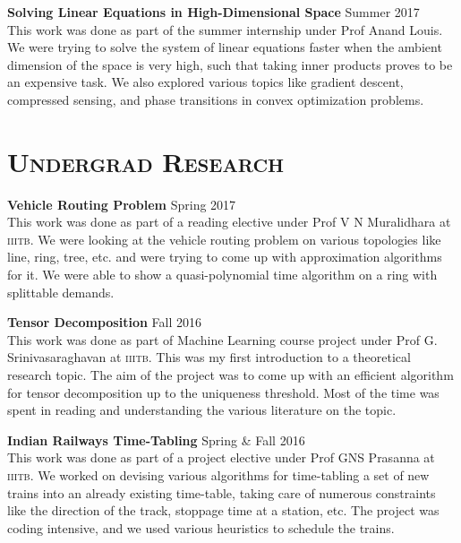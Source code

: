 \documentclass[line,margin]{res2}
\begin{document}
\begin{resume}
              {\bf Solving Linear Equations in High-Dimensional Space} \hfill Summer 2017\\
              This work was done as part of the summer internship under Prof Anand Louis. We were trying to solve the system of linear equations faster when the ambient dimension of the space is very high, such that taking inner products proves to be an expensive task. We also explored various topics like gradient descent, compressed sensing, and phase transitions in convex optimization problems.

\section{\textsc{Undergrad Research}}


               {\bf Vehicle Routing Problem} \hfill Spring 2017\\
              This work was done as part of a reading elective under {Prof V N Muralidhara} at \textsc{iiitb}. We were looking at the vehicle routing problem on various topologies like line, ring, tree, etc. and were trying to come up with approximation algorithms for it. We were able to show a quasi-polynomial time algorithm on a ring with splittable demands.

              {\bf Tensor Decomposition} \hfill Fall 2016\\
              This work was done as part of Machine Learning course project under Prof G. Srinivasaraghavan at \textsc{iiitb}. This was my first introduction to a theoretical research topic. The aim of the project was to come up with an efficient algorithm for tensor decomposition up to the uniqueness threshold. Most of the time was spent in reading and understanding the various literature on the topic.

              {\bf Indian Railways Time-Tabling} \hfill Spring \& Fall 2016\\
              This work was done as part of a project elective under {Prof GNS Prasanna} at \textsc{iiitb}. We worked on devising various algorithms for time-tabling a set of new trains into an already existing time-table, taking care of numerous constraints like the direction of the track, stoppage time at a station, etc. The project was coding intensive, and we used various heuristics to schedule the trains.

\begin{itemize}

\end{itemize}
\end{resume}
\end{document}
